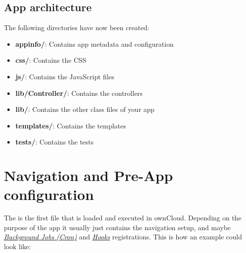 \documentclass[letterpaper,10pt,english]{sphinxmanual}
\begin{document}
\subsection{App architecture}
\label{app/startapp:app-architecture}
The following directories have now been created:
\begin{itemize}
\item {} 
\textbf{appinfo/}: Contains app metadata and configuration

\item {} 
\textbf{css/}: Contains the CSS

\item {} 
\textbf{js/}: Contains the JavaScript files

\item {} 
\textbf{lib/Controller/}: Contains the controllers

\item {} 
\textbf{lib/}: Contains the other class files of your app

\item {} 
\textbf{templates/}: Contains the templates

\item {} 
\textbf{tests/}: Contains the tests

\end{itemize}


\section{Navigation and Pre-App configuration}
\label{app/init::doc}\label{app/init:navigation-and-pre-app-configuration}
The  is the first file that is loaded and executed in ownCloud. Depending on the purpose of the app it usually just contains the navigation setup, and maybe {\hyperref[app/backgroundjobs::doc]{\emph{Background Jobs (Cron)}}} and {\hyperref[app/hooks::doc]{\emph{Hooks}}} registrations. This is how an example  could look like:
\end{document}
